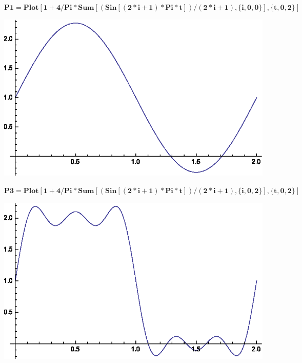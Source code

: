 \documentclass{article}
\begin{document}
\begin{doublespace}
\noindent\(\pmb{\text{}}\)
\end{doublespace}

\begin{doublespace}
\noindent\(\pmb{\text{}}\)
\end{doublespace}

\begin{doublespace}
\noindent\(\pmb{\text{}}\)
\end{doublespace}

\begin{doublespace}
\noindent\(\pmb{\text{}}\)
\end{doublespace}

\begin{doublespace}
\noindent\(\pmb{\text{P1}=\text{Plot}[1+4/\text{Pi}*\text{Sum}[(\text{Sin}[(2*i+1)*\text{Pi}*t])/(2*i+1),\{i,0,0\}],\{t,0,2\}]}\)
\end{doublespace}

\includegraphics{ex10_gr1.eps}

\begin{doublespace}
\noindent\(\pmb{\text{P3}=\text{Plot}[1+4/\text{Pi}*\text{Sum}[(\text{Sin}[(2*i+1)*\text{Pi}*t])/(2*i+1),\{i,0,2\}],\{t,0,2\}]}\)
\end{doublespace}

\includegraphics{ex10_gr2.eps}
\end{document}
